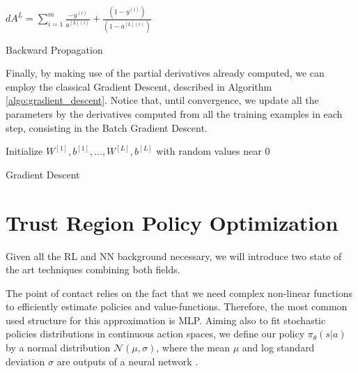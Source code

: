 \begin{algorithm}[H]
    \DontPrintSemicolon
    \SetAlgoLined
    $dA^{L} = \sum_{i=1}^m{\frac{-y^{(i)}}{a^{[L](i)}} + \frac{(1-y^{(i)})}{(1-a^{[L](i)})}}$\;
    \caption{Backward Propagation}
    \label{algo:backward_propagation}
\end{algorithm}

Finally, by making use of the partial derivatives already computed, we can employ the classical Gradient Descent, described in Algorithm \ref{algo:gradient_descent}. Notice that, until convergence, we update all the parameters by the derivatives computed from all the training examples in each step, consisting in the Batch Gradient Descent.

\begin{algorithm}[H]
    \DontPrintSemicolon
    \SetAlgoLined
    Initialize $W^{[1]},b^{[1]},...,W^{[L]},b^{[L]}$ with random values near $0$\;
    \caption{Gradient Descent}
    \label{algo:gradient_descent}
\end{algorithm}


\section{Trust Region Policy Optimization}

Given all the RL and NN background necessary, we will introduce two state of the art techniques combining both fields.

The point of contact relies on the fact that we need complex non-linear functions to efficiently estimate policies and value-functions. Therefore, the most common used structure for this approximation is MLP. Aiming also to fit stochastic policies distributions in continuous action spaces, we define our policy $\pi_{\theta}(s|a)$ by a normal distribution $\mathcal{N}(\mu,\sigma)$, where the mean $\mu$ and log standard deviation $\sigma$ are outputs of a neural network \cite{TRPO}.


